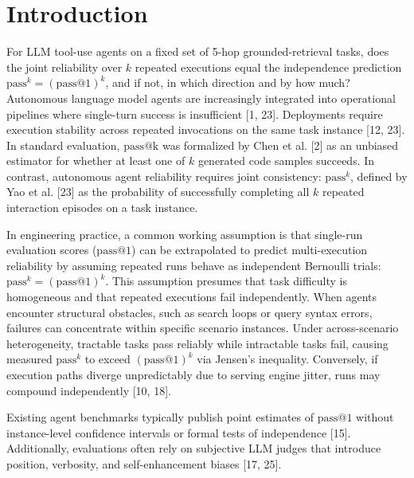 \documentclass[11pt,letterpaper]{article}
\begin{document}
\begin{abstract}
All runs were conducted at pinned temperature 0.0, where run-to-run variation is driven by serving infrastructure nondeterminism rather than stochastic sampling [10, 16, 18].
\end{abstract}


\section{Introduction}

For LLM tool-use agents on a fixed set of 5-hop grounded-retrieval tasks, does the joint reliability over $k$ repeated executions equal the independence prediction $\text{pass}^k = (\text{pass@1})^k$, and if not, in which direction and by how much? Autonomous language model agents are increasingly integrated into operational pipelines where single-turn success is insufficient [1, 23]. Deployments require execution stability across repeated invocations on the same task instance [12, 23]. In standard evaluation, $\text{pass@k}$ was formalized by Chen et al. [2] as an unbiased estimator for whether at least one of $k$ generated code samples succeeds. In contrast, autonomous agent reliability requires joint consistency: $\text{pass}^k$, defined by Yao et al. [23] as the probability of successfully completing all $k$ repeated interaction episodes on a task instance.

In engineering practice, a common working assumption is that single-run evaluation scores ($\text{pass@1}$) can be extrapolated to predict multi-execution reliability by assuming repeated runs behave as independent Bernoulli trials: $\text{pass}^k = (\text{pass@1})^k$. This assumption presumes that task difficulty is homogeneous and that repeated executions fail independently. When agents encounter structural obstacles, such as search loops or query syntax errors, failures can concentrate within specific scenario instances. Under across-scenario heterogeneity, tractable tasks pass reliably while intractable tasks fail, causing measured $\text{pass}^k$ to exceed $(\text{pass@1})^k$ via Jensen's inequality. Conversely, if execution paths diverge unpredictably due to serving engine jitter, runs may compound independently [10, 18].

Existing agent benchmarks typically publish point estimates of $\text{pass@1}$ without instance-level confidence intervals or formal tests of independence [15]. Additionally, evaluations often rely on subjective LLM judges that introduce position, verbosity, and self-enhancement biases [17, 25].
\end{document}
